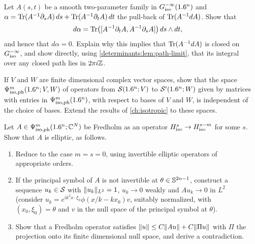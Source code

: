 \begin{exercise}\label{determinants:ex:closed}
  Let $A(s,t)$ be a smooth two-parameter family in $G^{-\infty}_{\mathrm{iso}}(1.6^n)$ and
  $\alpha=\operatorname{Tr}(A^{-1}\partial_sA)\,ds+\operatorname{Tr}(A^{-1}\partial_tA)\,dt$ the pull-back of
  $\operatorname{Tr}(A^{-1}dA)$. Show that
  \begin{equation*}
    d\alpha=\operatorname{Tr}\bigl([A^{-1}\partial_tA,A^{-1}\partial_sA]\bigr)\,ds\wedge dt,
  \end{equation*}
  and hence that $d\alpha=0$. Explain why this implies that
  $\operatorname{Tr}(A^{-1}dA)$ is closed on $G^{-\infty}_{\mathrm{iso}}$, and show directly, using
  \cref{determinants:lem:path-limit}, that its integral over any closed path
  lies in $2\pi i\mathbb{Z}$.
\end{exercise}

\begin{exercise}\label{determinants:ex:bundles}
  If $V$ and $W$ are finite dimensional complex vector spaces, show that the
  space $\Psi^{m}_{\mathrm{iso,ph}}(1.6^n;V,W)$ of operators from $\mathcal{S}(1.6^n;V)$ to
  $\mathcal{S}'(1.6^n;W)$ given by matrices with entries in $\Psi^{m}_{\mathrm{iso,ph}}(1.6^n)$, with
  respect to bases of $V$ and $W$, is independent of the choice of bases.
  Extend the results of \cref{ch:isotropic} to these spaces.
\end{exercise}

\begin{exercise}\label{determinants:ex:necessity}
  Let $A\in\Psi^{m}_{\mathrm{iso,ph}}(1.6^n;\mathbb{C}^N)$ be Fredholm as an operator
  $H^{s}_{\mathrm{iso}}\to H^{s-m}_{\mathrm{iso}}$ for some $s$. Show that $A$
  is elliptic, as follows.
  \begin{enumerate}
  \item Reduce to the case $m=s=0$, using invertible elliptic operators of
    appropriate orders.
  \item If the principal symbol of $A$ is not invertible at
    $\theta\in\mathbb{S}^{2n-1}$, construct a sequence $u_k\in\mathcal{S}$ with
    $\lVert u_k\rVert_{L^2}=1$, $u_k\to0$ weakly and $Au_k\to0$ in $L^2$ (consider
    $u_k=e^{ik^2x\cdot\xi_0}\phi(x/k-kx_0)v$, suitably normalized, with
    $(x_0,\xi_0)=\theta$ and $v$ in the null space of the principal symbol at
    $\theta$).
  \item Show that a Fredholm operator satisfies $\lVert u\rVert\le C\lVert Au\rVert+C\lVert \Pi u\rVert$ with $\Pi$ the
    projection onto its finite dimensional null space, and derive a
    contradiction.
  \end{enumerate}
\end{exercise}

